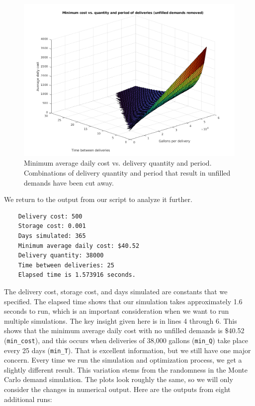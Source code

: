 \documentclass{article}
\begin{document}
    \begin{figure}[p]
        \centering
        \includegraphics[width=\textwidth]{img/surface4.png}
        \caption{Minimum average daily cost vs. delivery quantity and period. Combinations of delivery quantity and period that result in unfilled demands have been cut away.}
        \label{fig:surface4}
    \end{figure}

    \clearpage

    We return to the output from our script to analyze it further.

    \begin{verbatim}
    Delivery cost: 500
    Storage cost: 0.001
    Days simulated: 365
    Minimum average daily cost: $40.52
    Delivery quantity: 38000
    Time between deliveries: 25
    Elapsed time is 1.573916 seconds.\end{verbatim}

    The delivery cost, storage cost, and days simulated are constants that we specified. The elapsed time shows that our simulation takes approximately 1.6 seconds to run, which is an important consideration when we want to run multiple simulations. The key insight given here is in lines 4 through 6. This shows that the minimum average daily cost with no unfilled demands is \$40.52 (\texttt{min\_cost}), and this occurs when deliveries of 38,000 gallons (\texttt{min\_Q}) take place every 25 days (\texttt{min\_T}). That is excellent information, but we still have one major concern. Every time we run the simulation and optimization process, we get a slightly different result. This variation stems from the randomness in the Monte Carlo demand simulation. The plots look roughly the same, so we will only consider the changes in numerical output. Here are the outputs from eight additional runs:
\end{document}
